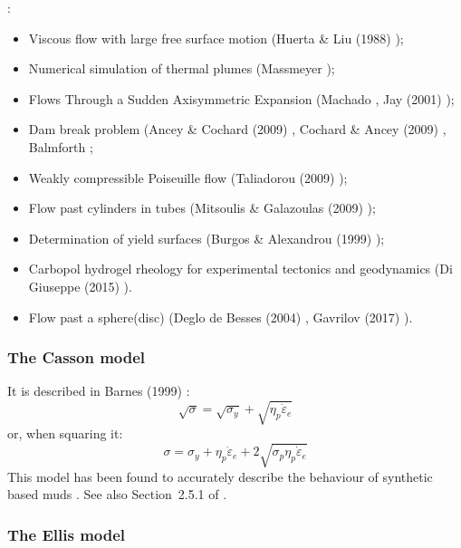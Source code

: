 \noindent\Literature: 
\begin{itemize}
\item Viscous flow with large free surface motion (Huerta \& Liu (1988) \cite{huli88});
\item Numerical simulation of thermal plumes (Massmeyer \etal \cite{madd13}); 
\item Flows Through a Sudden Axisymmetric Expansion (Machado \etal \cite{mazf}, 
      Jay \etal (2001) \cite{jamp01}); 
\item Dam break problem (Ancey \& Cochard (2009) \cite{anco09}, 
      Cochard \& Ancey (2009) \cite{coan09}, Balmforth \etal \cite{bafp09};
\item Weakly compressible Poiseuille flow (Taliadorou (2009) \cite{tagm09});
\item Flow past cylinders in tubes (Mitsoulis \& Galazoulas (2009) \cite{miga09});
\item Determination of yield surfaces (Burgos \& Alexandrou (1999) \cite{buae99});
\item Carbopol hydrogel rheology for experimental
      tectonics and geodynamics (Di Giuseppe \etal (2015) \cite{dicf15}).
\item Flow past a sphere(disc) (Deglo de Besses \etal (2004) \cite{demj04}, 
      Gavrilov \etal (2017) \cite{gafp17}). \mscthesis{} 
\end{itemize}


\subsubsection{The Casson model}

It is described in Barnes (1999) \cite{barn99}:
\begin{equation}
\sqrt{\sigma} = \sqrt{\sigma_y} + \sqrt{\eta_p \dot{\varepsilon}_e} 
\end{equation}
or, when squaring it:
\begin{equation}
\sigma = \sigma_y + \eta_p \dot{\varepsilon}_e + 2\sqrt{\sigma_p \eta_p \dot{\varepsilon}_e} 
\end{equation}
This model has been found to accurately describe the behaviour of synthetic based muds \cite{adlo17}. 
See also Section~2.5.1 of \textcite{macosko}. 

\subsubsection{The Ellis model\label{ss:ellis}}

